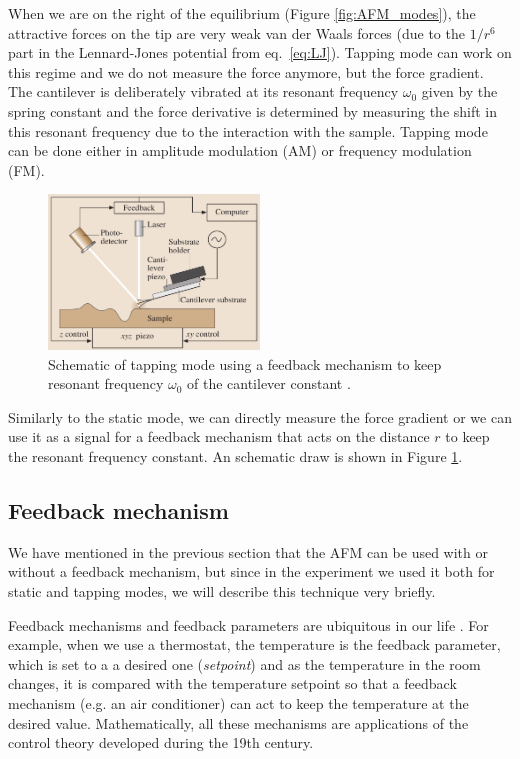 \documentclass[11pt,a4paper]{article}
\begin{document}
When we are on the right of the equilibrium (Figure \ref{fig:AFM_modes}), the attractive forces on the tip are very weak van der Waals forces (due to the $1/r^6$ part in the Lennard-Jones potential from eq.~\eqref{eq:LJ}). Tapping mode can work on this regime and we do not measure the force anymore, but the force gradient. The cantilever is deliberately vibrated at its resonant frequency $\omega_0$ given by the spring constant and the force derivative is determined by measuring the shift in this resonant frequency due to the interaction with the sample. Tapping mode can be done either in amplitude modulation (AM) or frequency modulation (FM).

\begin{figure}[ht]
\centering
\includegraphics[width=0.5\textwidth]{Tapping_mode}
\caption{Schematic of tapping mode using a feedback mechanism to keep resonant frequency $\omega_0$ of the cantilever constant \cite{Bhushan}.}
\label{fig:Deflection_measurement}
\end{figure}

Similarly to the static mode, we can directly measure the force gradient or we can use it as a signal for a feedback mechanism that acts on the distance $r$ to keep the resonant frequency constant. An schematic draw is shown in Figure \ref{fig:Deflection_measurement}.

\subsection{Feedback mechanism}\label{sec:feedback}
We have mentioned in the previous section that the AFM can be used with or without a feedback mechanism, but since in the experiment we used it both for static and tapping modes, we will describe this technique very briefly.

Feedback mechanisms and feedback parameters are ubiquitous in our life \cite{nanosurf}. For example, when we use a thermostat, the temperature is the feedback parameter, which is set to a a desired one (\emph{setpoint}) and as the temperature in the room changes, it is compared with the temperature setpoint so that a feedback mechanism (e.g. an air conditioner) can act to keep the temperature at the desired value. Mathematically, all these mechanisms are applications of the control theory developed during the 19th century.
\end{document}
